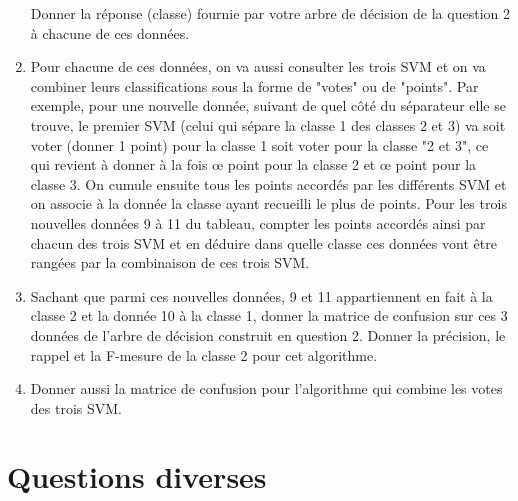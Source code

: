 \documentclass[a4paper, 11pt]{article}
\begin{document}
\begin{enumerate}
		Donner la réponse (classe) fournie par votre arbre de décision de la question 2 à chacune de ces
		données.
	\item Pour chacune de ces données, on va aussi consulter les trois SVM et on va combiner leurs
		classifications sous la forme de "votes" ou de "points". Par exemple, pour une nouvelle donnée,
		suivant de quel côté du séparateur elle se trouve, le premier SVM (celui qui sépare la classe 1
		des classes 2 et 3) va soit voter (donner 1 point) pour la classe 1 soit voter pour la classe "2
		et 3", ce qui revient à donner à la fois œ point pour la classe 2 et œ point pour la classe 3.
		On cumule ensuite tous les points accordés par les différents SVM et on associe à la donnée la
		classe ayant recueilli le plus de points. Pour les trois nouvelles données 9 à 11 du tableau,
		compter les points accordés ainsi par chacun des trois SVM et en déduire dans quelle classe ces
		données vont être rangées par la combinaison de ces trois SVM.
	\item Sachant que parmi ces nouvelles données, 9 et 11 appartiennent en fait à la classe 2 et la
		donnée 10 à la classe 1, donner la matrice de confusion sur ces 3 données de l'arbre de décision
		construit en question 2. Donner la précision, le rappel et la F-mesure de la classe 2 pour cet
		algorithme.
	\item Donner aussi la matrice de confusion pour l'algorithme qui combine les votes des trois SVM. 
\end{enumerate}

\section{Questions diverses}
\end{document}
